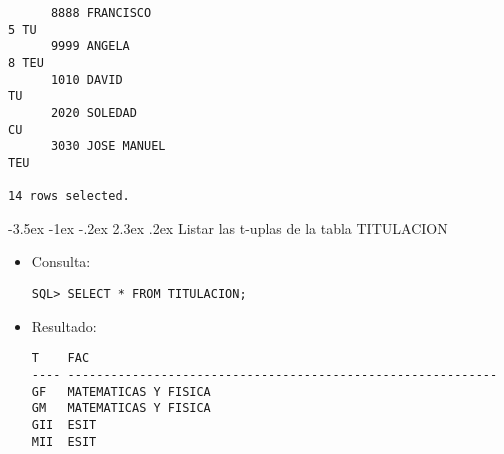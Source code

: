 \documentclass[11pt]{report}
\makeatletter
\renewcommand\chapter{\@startsection{chapter}{0}{\z@}%
    {-3.5ex \@plus -1ex \@minus -.2ex}%
    {2.3ex \@plus.2ex}%
    {\normalfont\Large\bfseries}}
\makeatother
\begin{document}
\begin{itemize}
\begin{verbatim}
      8888 FRANCISCO                                                             5 TU                                                                                                                   
      9999 ANGELA                                                                8 TEU                                                                                                                  
      1010 DAVID                                                                   TU                                                                                                                   
      2020 SOLEDAD                                                                 CU                                                                                                                   
      3030 JOSE MANUEL                                                             TEU                                                                                                                  

14 rows selected.
  \end{verbatim}
\end{itemize}

\chapter{Listar las t-uplas de la tabla TITULACION}
\begin{itemize}
  \item Consulta:
  \begin{verbatim}
SQL> SELECT * FROM TITULACION;
  \end{verbatim}
  \item{Resultado:}
  \begin{verbatim}
T    FAC                                                                                                                                                                                                
---- ------------------------------------------------------------                                                                                                                                       
GF   MATEMATICAS Y FISICA                                                                                                                                                                               
GM   MATEMATICAS Y FISICA                                                                                                                                                                               
GII  ESIT                                                                                                                                                                                               
MII  ESIT         
  \end{verbatim}
\end{itemize}
\end{document}
